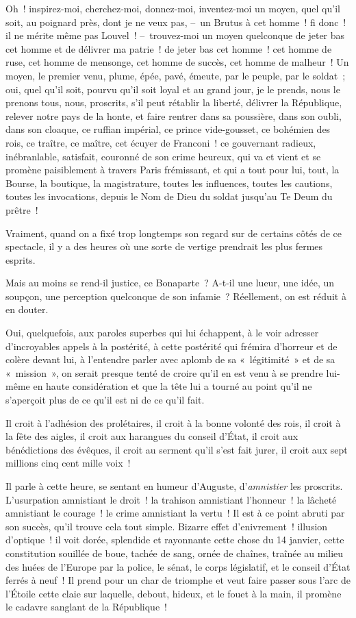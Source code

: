 \documentclass[french,twoside]{book} %
\begin{document}
Oh ! inspirez-moi, cherchez-moi, donnez-moi, inventez-moi un moyen, quel qu’il soit, au poignard près, dont je ne veux pas, – un Brutus à cet homme ! fi donc ! il ne mérite même pas Louvel ! – trouvez-moi un moyen quelconque de jeter bas cet homme et de délivrer ma patrie ! de jeter bas cet homme ! cet homme de ruse, cet homme de mensonge, cet homme de succès, cet homme de malheur ! Un moyen, le premier venu, plume, épée, pavé, émeute, par le peuple, par le soldat ; oui, quel qu’il soit, pourvu qu’il soit loyal et au grand jour, je le prends, nous le prenons tous, nous, proscrits, s’il peut rétablir la liberté, délivrer la République, relever notre pays de la honte, et faire rentrer dans sa poussière, dans son oubli, dans son cloaque, ce ruffian impérial, ce prince vide-gousset, ce bohémien des rois, ce traître, ce maître, cet écuyer de Franconi ! ce gouvernant radieux, inébranlable, satisfait, couronné de son crime heureux, qui va et vient et se promène paisiblement à travers Paris frémissant, et qui a tout pour lui, tout, la Bourse, la boutique, la magistrature, toutes les influences, toutes les cautions, toutes les invocations, depuis le Nom de Dieu du soldat jusqu’au Te Deum du prêtre !\par
Vraiment, quand on a fixé trop longtemps son regard sur de certains côtés de ce spectacle, il y a des heures où une sorte de vertige prendrait les plus fermes esprits.\par
Mais au moins se rend-il justice, ce Bonaparte ? A-t-il une lueur, une idée, un soupçon, une perception quelconque de son infamie ? Réellement, on est réduit à en douter.\par
Oui, quelquefois, aux paroles superbes qui lui échappent, à le voir adresser d’incroyables appels à la postérité, à cette postérité qui frémira d’horreur et de colère devant lui, à l’entendre parler avec aplomb de sa « légitimité » et de sa « mission », on serait presque tenté de croire qu’il en est venu à se prendre lui-même en haute considération et que la tête lui a tourné au point qu’il ne s’aperçoit plus de ce qu’il est ni de ce qu’il fait.\par
Il croit à l’adhésion des prolétaires, il croit à la bonne volonté des rois, il croit à la fête des aigles, il croit aux harangues du conseil d’État, il croit aux bénédictions des évêques, il croit au serment qu’il s’est fait jurer, il croit aux sept millions cinq cent mille voix !\par
Il parle à cette heure, se sentant en humeur d’Auguste, d’\emph{amnistier} les proscrits. L’usurpation amnistiant le droit ! la trahison amnistiant l’honneur ! la lâcheté amnistiant le courage ! le crime amnistiant la vertu ! Il est à ce point abruti par son succès, qu’il trouve cela tout simple. Bizarre effet d’enivrement ! illusion d’optique ! il voit dorée, splendide et rayonnante cette chose du 14 janvier, cette constitution souillée de boue, tachée de sang, ornée de chaînes, traînée au milieu des huées de l’Europe par la police, le sénat, le corps législatif, et le conseil d’État ferrés à neuf ! Il prend pour un char de triomphe et veut faire passer sous l’arc de l’Étoile cette claie sur laquelle, debout, hideux, et le fouet à la main, il promène le cadavre sanglant de la République !
\end{document}
